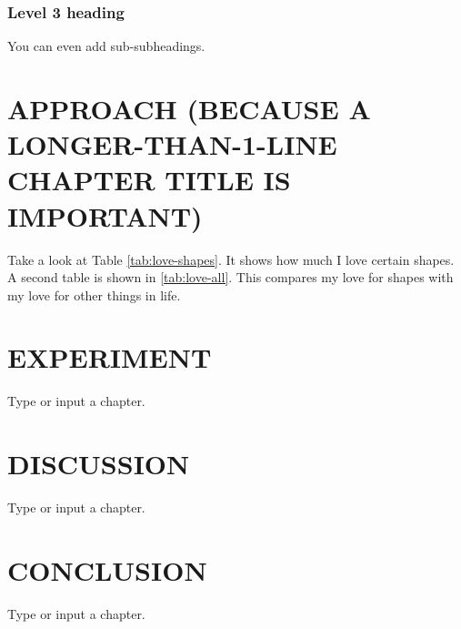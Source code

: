 \documentclass[dissertation]{uathesis-2024}
\begin{document}
\begin{body}
\subsection{Level 3 heading}
You can even add sub-subheadings.

\chapter{APPROACH (BECAUSE A LONGER-THAN-1-LINE CHAPTER TITLE IS IMPORTANT)}
Take a look at Table \ref{tab:love-shapes}. It shows how much I love certain
shapes. A second table is shown in \ref{tab:love-all}. This compares my love for shapes with my love for other things in life.

\begin{table}[h]
  \centering
  
  \caption{Shapes and corresponding love in Love Standard Units (LSU).This table has a long caption that is important for highlighting the formatting.}
  \label{tab:love-shapes}
\end{table}

\begin{table}[h]
  \centering
  
  \caption{Other objects and corresponding love in Love Standard Units (LSU).}
  \label{tab:love-all}
\end{table}

\chapter{EXPERIMENT}
Type or input{} a chapter. \cite{latex2e,knuth:1984}

\chapter{DISCUSSION}
Type or input{} a chapter. \cite{latex:companion}

\chapter{CONCLUSION}
Type or input{} a chapter. \cite{texbook}


\clearpage
{}


\end{body}
\end{document}
